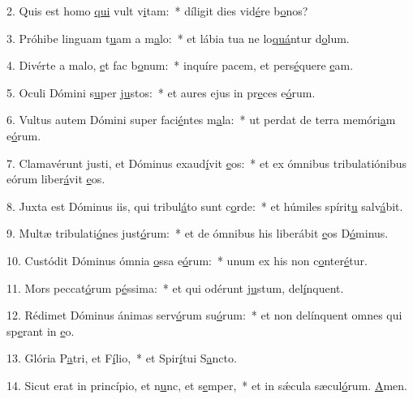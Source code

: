 2. Quis est homo \uline{qui} vult v\uline{i}tam:~* díligit dies vid\uline{é}re b\uline{o}nos?\par 
3. Próhibe linguam t\uline{u}am a m\uline{a}lo:~* et lábia tua ne lo\uline{quá}ntur d\uline{o}lum.\par 
4. Divérte a malo, \uline{e}t fac b\uline{o}num:~* inquíre pacem, et pers\uline{é}quere \uline{e}am.\par 
5. Oculi Dómini s\uline{u}per j\uline{u}stos:~* et aures ejus in pr\uline{e}ces e\uline{ó}rum.\par 
6. Vultus autem Dómini super faci\uline{é}ntes m\uline{a}la:~* ut perdat de terra memóri\uline{a}m e\uline{ó}rum.\par 
7. Clamavérunt justi, et Dóminus exaud\uline{í}vit \uline{e}os:~* et ex ómnibus tribulatiónibus eórum liber\uline{á}vit \uline{e}os.\par 
8. Juxta est Dóminus iis, qui tribul\uline{á}to sunt c\uline{o}rde:~* et húmiles spírit\uline{u} salv\uline{á}bit.\par 
9. Multæ tribulati\uline{ó}nes just\uline{ó}rum:~* et de ómnibus his liberábit \uline{e}os D\uline{ó}minus.\par 
10. Custódit Dóminus ómnia \uline{o}ssa e\uline{ó}rum:~* unum ex his non c\uline{o}nter\uline{é}tur.\par 
11. Mors peccat\uline{ó}rum p\uline{é}ssima:~* et qui odérunt j\uline{u}stum, del\uline{í}nquent.\par 
12. Rédimet Dóminus ánimas serv\uline{ó}rum su\uline{ó}rum:~* et non delínquent omnes qui sp\uline{e}rant in \uline{e}o.\par 
13. Glória P\uline{a}tri, et F\uline{í}lio,~* et Spir\uline{í}tui S\uline{a}ncto.\par 
14. Sicut erat in princípio, et n\uline{u}nc, et s\uline{e}mper,~* et in sǽcula sæcul\uline{ó}rum. \uline{A}men.\par 
